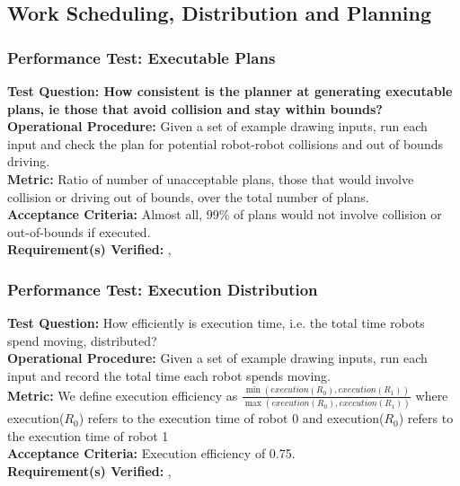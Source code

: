 
\subsection{Work Scheduling, Distribution and Planning}
\label{sec:verification_sdp}

\subsubsection{Performance Test: Executable Plans}
\label{sec:sdp_pt_executable}
\textbf{Test Question: How consistent is the planner at generating executable plans, ie those that avoid collision and stay within bounds?} \\
\textbf{Operational Procedure:} Given a set of example drawing inputs, run each input and check the plan for potential robot-robot collisions and out of bounds driving. \\
\textbf{Metric:} Ratio of number of unacceptable plans, those that would involve collision or driving out of bounds, over the total number of plans. \\
\textbf{Acceptance Criteria:} Almost all, 99\% of plans would not involve collision or out-of-bounds if executed. \\
\textbf{Requirement(s) Verified:} , 

\subsubsection{Performance Test: Execution Distribution}
\label{sec:sdp_pt_execu}
\textbf{Test Question:} How efficiently is execution time, i.e. the total time robots spend moving, distributed?\\
\textbf{Operational Procedure:} Given a set of example drawing inputs, run each input and record the total time each robot spends moving. \\
\textbf{Metric:} We define execution efficiency as $\frac{\min(execution(R_{0}), execution(R_{1}))}{\max(execution(R_{0}), execution(R_{1}))}$ where execution($R_{0}$) refers to the execution time of robot 0 and execution($R_{0}$) refers to the execution time of robot 1\\
\textbf{Acceptance Criteria:} Execution efficiency of 0.75.\\
\textbf{Requirement(s) Verified:} , 

